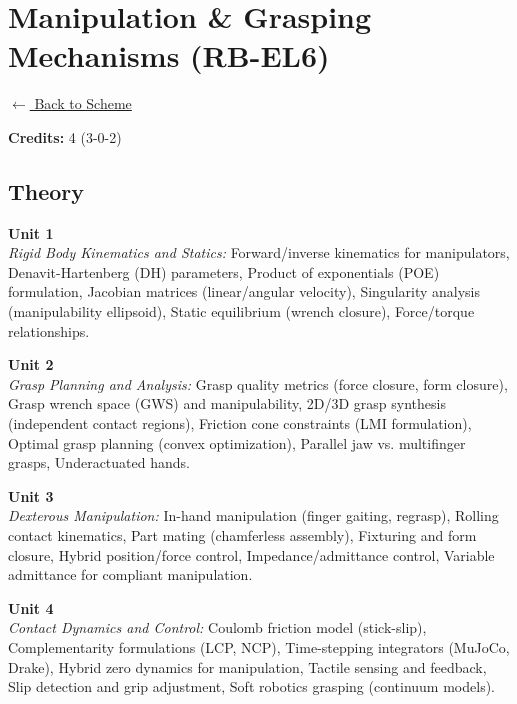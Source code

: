\section*{Manipulation \& Grasping Mechanisms (RB-EL6)}
\label{elec:RB_6}

\noindent \small{\hyperref[main:scheme]{$\leftarrow$ Back to Scheme}} \vspace{0.5cm}

\noindent \textbf{Credits:} 4 (3-0-2)

\subsection*{Theory}
\noindent\textbf{Unit 1} \\
\textit{Rigid Body Kinematics and Statics:} Forward/inverse kinematics for manipulators, Denavit-Hartenberg (DH) parameters, Product of exponentials (POE) formulation, Jacobian matrices (linear/angular velocity), Singularity analysis (manipulability ellipsoid), Static equilibrium (wrench closure), Force/torque relationships.

\vspace{0.3cm}

\noindent\textbf{Unit 2} \\
\textit{Grasp Planning and Analysis:} Grasp quality metrics (force closure, form closure), Grasp wrench space (GWS) and manipulability, 2D/3D grasp synthesis (independent contact regions), Friction cone constraints (LMI formulation), Optimal grasp planning (convex optimization), Parallel jaw vs. multifinger grasps, Underactuated hands.

\vspace{0.3cm}

\noindent\textbf{Unit 3} \\
\textit{Dexterous Manipulation:} In-hand manipulation (finger gaiting, regrasp), Rolling contact kinematics, Part mating (chamferless assembly), Fixturing and form closure, Hybrid position/force control, Impedance/admittance control, Variable admittance for compliant manipulation.

\vspace{0.3cm}

\noindent\textbf{Unit 4} \\
\textit{Contact Dynamics and Control:} Coulomb friction model (stick-slip), Complementarity formulations (LCP, NCP), Time-stepping integrators (MuJoCo, Drake), Hybrid zero dynamics for manipulation, Tactile sensing and feedback, Slip detection and grip adjustment, Soft robotics grasping (continuum models).

